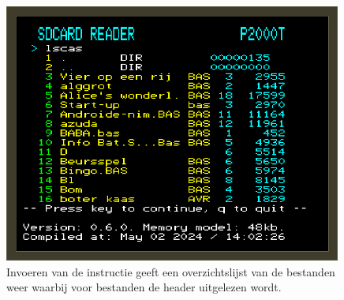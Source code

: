 \begin{figure}[h!]
    \centering
    \includegraphics[width=0.99\textwidth]{img/lscas.png}
    \caption{Invoeren van de instructie  geeft een overzichtslijst van de bestanden weer waarbij voor \cas bestanden de header uitgelezen wordt.}
    \label{fig:screenshot-lscas}
\end{figure}

